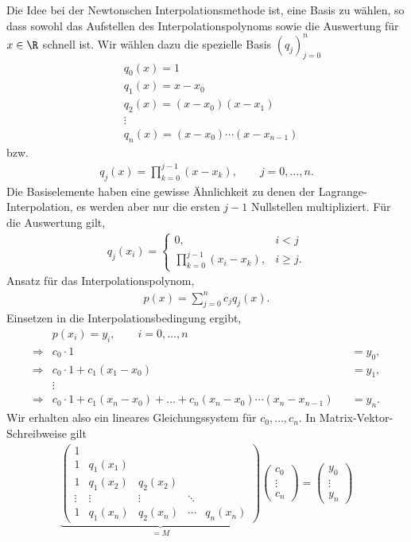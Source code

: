 Die Idee bei der Newtonschen Interpolationsmethode ist, eine Basis zu wählen,
so dass sowohl das Aufstellen des Interpolationspolynoms sowie die Auswertung
für $x\in\R$ schnell ist. Wir wählen dazu die spezielle Basis $(q_j)_{j=0}^{n}$
\begin{align*}
&q_0(x) = 1\\
&q_1(x) = x-x_0\\
&q_2(x) = (x-x_0)(x-x_1)\\
&\vdots\\
&q_n(x) = (x-x_0)\cdots(x-x_{n-1})
\end{align*}
bzw.
\begin{align*}
q_j(x) = \prod\limits_{k=0}^{j-1} (x-x_k),\qquad j=0,\ldots,n.\tag{3}
\end{align*}
Die Basiselemente haben eine gewisse Ähnlichkeit zu denen der
Lagrange-Interpolation, es werden aber nur die ersten $j-1$ Nullstellen
multipliziert. Für die Auswertung gilt,
\begin{align*}
q_j(x_i) = \begin{cases}
0, & i<j\\
\prod\limits_{k=0}^{j-1} (x_i-x_k), & i\ge j.
\end{cases}
\end{align*}
Ansatz für das Interpolationspolynom,
\begin{align*}
p(x) = \sum\limits_{j=0}^n c_j q_j(x).
\end{align*}
Einsetzen in die Interpolationsbedingung ergibt,
\begin{align*}
&p(x_i) = y_i,\qquad i=0,\ldots,n\\
\Rightarrow & c_0\cdot 1 &&= y_0,\\
\Rightarrow & c_0\cdot 1 + c_1(x_1-x_0) &&= y_1,\\
&\vdots\\
\Rightarrow & c_0\cdot 1 + c_1(x_n-x_0) + \ldots +
c_n(x_n-x_0)\cdots(x_n-x_{n-1}) &&= y_n.
\end{align*}
Wir erhalten also ein lineares Gleichungssystem für $c_0,\ldots,c_n$. In
Matrix-Vektor-Schreibweise gilt
\begin{align*}
\underbrace{\begin{pmatrix}
1 \\
1 & q_1(x_1)\\
1 & q_1(x_2) & q_2(x_2)\\
\vdots & \vdots & \vdots & \ddots \\
1 & q_1(x_n) & q_2(x_n) & \cdots & q_n(x_n)
\end{pmatrix}}_{=M}
\begin{pmatrix}
c_0\\ \vdots \\c_n
\end{pmatrix}
=
\begin{pmatrix}
y_0\\ \vdots \\y_n
\end{pmatrix}\tag{4}
\end{align*}
